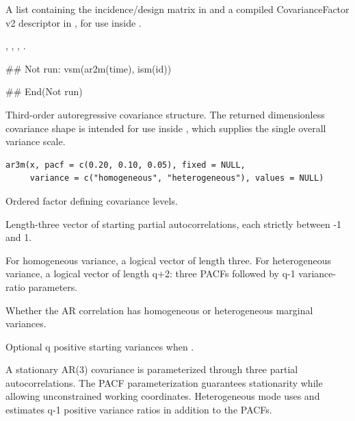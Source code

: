 \documentclass[a4paper]{book}
\begin{document}
%
\begin{Value}
A list containing the incidence/design matrix in  and a compiled CovarianceFactor v2 descriptor in , for use inside .
\end{Value}
%
\begin{SeeAlso}\relax
{}, , , .
\end{SeeAlso}
%
\begin{Examples}
\begin{ExampleCode}
## Not run: 
vsm(ar2m(time), ism(id))

## End(Not run)
\end{ExampleCode}
\end{Examples}
%
\begin{Description}\relax
Third-order autoregressive covariance structure. The returned dimensionless covariance shape is intended for use inside , which supplies the single overall variance scale.
\end{Description}
%
\begin{Usage}
\begin{verbatim}
ar3m(x, pacf = c(0.20, 0.10, 0.05), fixed = NULL,
     variance = c("homogeneous", "heterogeneous"), values = NULL)
\end{verbatim}
\end{Usage}
%
\begin{Arguments}
\begin{ldescription}
\item[\code{x}] Ordered factor defining covariance levels.
\item[\code{pacf}] Length-three vector of starting partial autocorrelations, each strictly between -1 and 1.
\item[\code{fixed}] For homogeneous variance, a logical vector of length three. For heterogeneous variance, a logical vector of length q+2: three PACFs followed by q-1 variance-ratio parameters.
\item[\code{variance}] Whether the AR correlation has homogeneous or heterogeneous marginal variances.
\item[\code{values}] Optional q positive starting variances when .
\end{ldescription}
\end{Arguments}
%
\begin{Details}\relax
A stationary AR(3) covariance is parameterized through three partial autocorrelations. The PACF parameterization guarantees stationarity while allowing unconstrained working coordinates. Heterogeneous mode uses  and estimates q-1 positive variance ratios in addition to the PACFs.
\end{Details}
\end{document}
